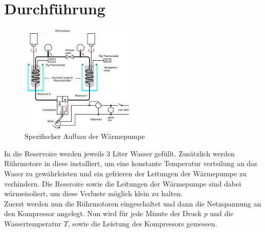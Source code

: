 \section{Durchführung}
\label{sec:Durchfuehrung}
\begin{figure}[H]
    \centering
    \includegraphics[width=0.5\textwidth]{bilder/aufbau_spezifisch.jpg}
    \caption{Spezifischer Aufbau der Wärmepumpe \cite[197]{Anleitung}}
    \label{fig:aufbau_spezifisch}
\end{figure}

In die Reservoire werden jeweils 3 Liter Wasser gefüllt. Zusätzlich werden
Rührmotore in diese installiert, um eine konstante Temperatur verteilung an 
das Waser zu gewährleisten und ein gefrieren der Leitungen der Wärmepumpe zu verhindern.
Die Reseroire sowie die Leitungen der Wärmepumpe sind dabei wärmeisoliert,
um diese Verluste möglich klein zu halten.\\

Zuerst werden nun die Rührmotoren eingeschaltet und dann die Netzspannung
an den Kompressor angelegt.
Nun wird für jede Minute der Druck $p$ und die Wassertemperatur $T$, sowie die 
Leistung des Kompressors gemessen.
